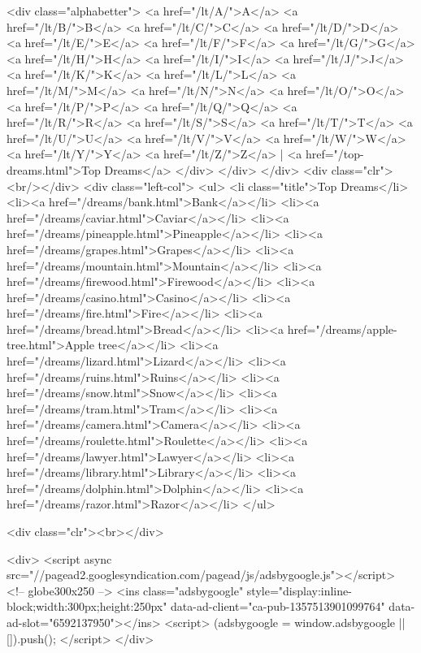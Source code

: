 			<div class="alphabetter">
							<a href="/lt/A/">A</a>
								<a href="/lt/B/">B</a>
								<a href="/lt/C/">C</a>
								<a href="/lt/D/">D</a>
								<a href="/lt/E/">E</a>
								<a href="/lt/F/">F</a>
								<a href="/lt/G/">G</a>
								<a href="/lt/H/">H</a>
								<a href="/lt/I/">I</a>
								<a href="/lt/J/">J</a>
								<a href="/lt/K/">K</a>
								<a href="/lt/L/">L</a>
								<a href="/lt/M/">M</a>
								<a href="/lt/N/">N</a>
								<a href="/lt/O/">O</a>
								<a href="/lt/P/">P</a>
								<a href="/lt/Q/">Q</a>
								<a href="/lt/R/">R</a>
								<a href="/lt/S/">S</a>
								<a href="/lt/T/">T</a>
								<a href="/lt/U/">U</a>
								<a href="/lt/V/">V</a>
								<a href="/lt/W/">W</a>
								<a href="/lt/Y/">Y</a>
								<a href="/lt/Z/">Z</a>
							| <a href="/top-dreams.html">Top Dreams</a>
			</div>
		</div>
	</div>
	<div class="clr"><br/></div>
	<div class="left-col">
		<ul>
			<li class="title">Top Dreams</li>
							<li><a href="/dreams/bank.html">Bank</a></li>
								<li><a href="/dreams/caviar.html">Caviar</a></li>
								<li><a href="/dreams/pineapple.html">Pineapple</a></li>
								<li><a href="/dreams/grapes.html">Grapes</a></li>
								<li><a href="/dreams/mountain.html">Mountain</a></li>
								<li><a href="/dreams/firewood.html">Firewood</a></li>
								<li><a href="/dreams/casino.html">Casino</a></li>
								<li><a href="/dreams/fire.html">Fire</a></li>
								<li><a href="/dreams/bread.html">Bread</a></li>
								<li><a href="/dreams/apple-tree.html">Apple tree</a></li>
								<li><a href="/dreams/lizard.html">Lizard</a></li>
								<li><a href="/dreams/ruins.html">Ruins</a></li>
								<li><a href="/dreams/snow.html">Snow</a></li>
								<li><a href="/dreams/tram.html">Tram</a></li>
								<li><a href="/dreams/camera.html">Camera</a></li>
								<li><a href="/dreams/roulette.html">Roulette</a></li>
								<li><a href="/dreams/lawyer.html">Lawyer</a></li>
								<li><a href="/dreams/library.html">Library</a></li>
								<li><a href="/dreams/dolphin.html">Dolphin</a></li>
								<li><a href="/dreams/razor.html">Razor</a></li>
						</ul>

		<div class="clr"><br></div>

		<div>
			<script async src="//pagead2.googlesyndication.com/pagead/js/adsbygoogle.js"></script>
			<!-- globe300x250 -->
			<ins class="adsbygoogle"
			     style="display:inline-block;width:300px;height:250px"
			     data-ad-client="ca-pub-1357513901099764"
			     data-ad-slot="6592137950"></ins>
			<script>
			(adsbygoogle = window.adsbygoogle || []).push({});
			</script>
		</div>

